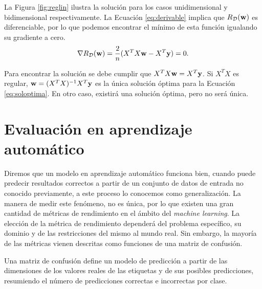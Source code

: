 \documentclass[oneside,openright,titlepage,numbers=noenddot,openany,headinclude,footinclude=true,
cleardoublepage=empty,abstractoff,BCOR=5mm,paper=a4,fontsize=12pt,main=spanish]{scrreprt}
\begin{document}
La Figura \ref{fig:reglin} ilustra la solución para los casos unidimensional y bidimensional respectivamente. La Ecuación \ref{eq:derivable} implica que $R_{\mathcal{D}}(\textbf{w})$ es diferenciable, por lo que podemos encontrar el mínimo de esta función igualando su gradiente a cero.
\begin{equation*}
    \nabla R_{\mathcal{D}}(\textbf{w}) = \frac{2}{n} (X^TX\textbf{w}-X^T\textbf{y}) = 0.
\end{equation*}

Para encontrar la solución se debe cumplir que $X^TX\textbf{w}=X^T\textbf{y}$. Si $X^TX$ es regular, $\textbf{w}=(X^TX)^{-1}X^T \textbf{y}$ es la única solución óptima para la Ecuación \ref{eq:soloptima}. En otro caso, existirá una solución óptima, pero no será única.

\section{Evaluación en aprendizaje automático}

\label{sec:evalaa}

Diremos que un modelo en aprendizaje automático funciona bien, cuando puede predecir resultados correctos a partir de un conjunto de datos de entrada no conocido previamente, a este proceso lo conocemos como generalización. La manera de medir este fenómeno, no es única, por lo que existen una gran cantidad de métricas de rendimiento en el ámbito del \textit{machine learning}. La elección de la métrica de rendimiento dependerá del problema específico, su dominio y de las restricciones del mismo al mundo real. Sin embargo, la mayoría de las métricas vienen descritas como funciones de una matriz de confusión. 

Una matriz de confusión define un modelo de predicción a partir de las dimensiones de los valores reales de las etiquetas y de sus posibles predicciones, resumiendo el número de predicciones correctas e incorrectas por clase.\\
\end{document}
